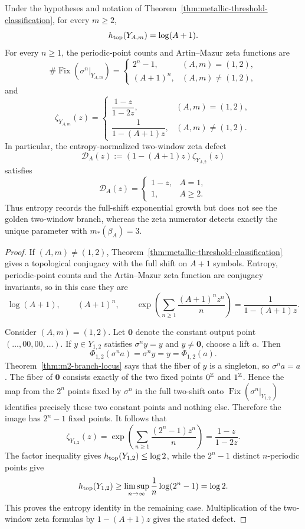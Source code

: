 \begin{theorem}
\label{thm:metallic-entropy-zeta-extremality}
Under the hypotheses and notation of
Theorem~\ref{thm:metallic-threshold-classification}, for every $m\ge2$,
\[
h_{\rm top}(Y_{A,m})=\log(A+1).
\]
For every $n\ge1$, the periodic-point counts and Artin--Mazur zeta functions
are
\[
\#\operatorname{Fix}(\sigma^n|_{Y_{A,m}})
=
\begin{cases}
2^n-1,&(A,m)=(1,2),\\
(A+1)^n,&(A,m)\ne(1,2),
\end{cases}
\]
and
\begin{equation}\label{eq:metallic-zeta-classification}
\zeta_{Y_{A,m}}(z)
=
\begin{cases}
\dfrac{1-z}{1-2z},&(A,m)=(1,2),\\[6pt]
\dfrac{1}{1-(A+1)z},&(A,m)\ne(1,2).
\end{cases}
\end{equation}
In particular, the entropy-normalized two-window zeta defect
\[
\mathcal D_A(z):=(1-(A+1)z)\zeta_{Y_{A,2}}(z)
\]
satisfies
\[
\mathcal D_A(z)=
\begin{cases}
1-z,&A=1,\\
1,&A\ge2.
\end{cases}
\]
Thus entropy records the full-shift exponential growth but does not see the
golden two-window branch, whereas the zeta numerator detects exactly the
unique parameter with $m_*(\beta_A)=3$.
\end{theorem}

\begin{proof}
If $(A,m)\ne(1,2)$, Theorem~\ref{thm:metallic-threshold-classification}
gives a topological conjugacy with the full shift on $A+1$ symbols.  Entropy,
periodic-point counts and the Artin--Mazur zeta function are conjugacy
invariants, so in this case they are
\[
\log(A+1),\qquad (A+1)^n,\qquad
\exp\left(\sum_{n\ge1}\frac{(A+1)^nz^n}{n}\right)
=\frac1{1-(A+1)z}.
\]

Consider $(A,m)=(1,2)$.  Let $\mathbf0$ denote the constant output point
$(\ldots,00,00,\ldots)$.  If $y\in Y_{1,2}$ satisfies $\sigma^ny=y$ and
$y\ne\mathbf0$, choose a lift $a$.  Then
\[
\Phi_{1,2}(\sigma^na)=\sigma^ny=y=\Phi_{1,2}(a).
\]
Theorem~\ref{thm:m2-branch-locus} says that the fiber of $y$ is a singleton,
so $\sigma^na=a$.  The fiber of $\mathbf0$ consists exactly of the two fixed
points $0^{\mathbb{Z}}$ and $1^{\mathbb{Z}}$.  Hence the map from the $2^n$ points fixed by
$\sigma^n$ in the full two-shift onto
$\operatorname{Fix}(\sigma^n|_{Y_{1,2}})$ identifies precisely these two
constant points and nothing else.  Therefore the image has $2^n-1$ fixed
points.  It follows that
\[
\zeta_{Y_{1,2}}(z)
=\exp\left(\sum_{n\ge1}\frac{(2^n-1)z^n}{n}\right)
=\frac{1-z}{1-2z}.
\]
The factor inequality gives $h_{\rm top}(Y_{1,2})\le\log2$, while the
$2^n-1$ distinct $n$-periodic points give
\[
h_{\rm top}(Y_{1,2})\ge
\limsup_{n\to\infty}\frac1n\log(2^n-1)=\log2.
\]
This proves the entropy identity in the remaining case.  Multiplication of
the two-window zeta formulas by $1-(A+1)z$ gives the stated defect.
\end{proof}

